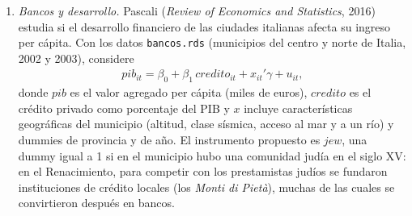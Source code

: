 \documentclass[letterpaper,11pt]{article}
\newcommand{\fn}[1]{{\unskip\nobreak\hfill\penalty50\hskip1em\null\nobreak\hfill
    \mbox{[#1]}\parfillskip=0pt\finalhyphendemerits=0\par}}
\begin{document}
\begin{enumerate}[itemsep=0.8em]
\item \emph{Bancos y desarrollo.} Pascali (\textit{Review of Economics and Statistics},
    2016) estudia si el desarrollo financiero de las ciudades italianas afecta su ingreso
    per cápita. Con los datos \texttt{bancos.rds} (municipios del centro y norte de Italia,
    2002 y 2003), considere
    \begin{align*}
    pib_{it}=\beta_0+\beta_1\, credito_{it}+x_{it}'\gamma+u_{it},
    \end{align*}
    donde $pib$ es el valor agregado per cápita (miles de euros), $credito$ es el crédito
    privado como porcentaje del PIB y $x$ incluye características geográficas del municipio
    (altitud, clase sísmica, acceso al mar y a un río) y dummies de provincia y de año. El
    instrumento propuesto es $jew$, una dummy igual a 1 si en el municipio hubo una
    comunidad judía en el siglo XV: en el Renacimiento, para competir con los prestamistas
    judíos se fundaron instituciones de crédito locales (los \textit{Monti di Pietà}), muchas
    de las cuales se convirtieron después en bancos.

\end{enumerate}
\end{document}
